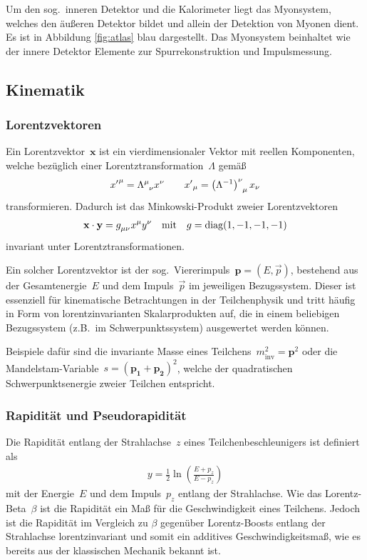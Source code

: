 \documentclass[11pt, a4paper]{article}
\numberwithin{equation}{section}
\begin{document}
Um den sog.\ inneren Detektor und die Kalorimeter liegt das Myonsystem, welches den äußeren Detektor bildet und allein der Detektion von Myonen dient.
Es ist in Abbildung \ref{fig:atlas} blau dargestellt.
Das Myonsystem beinhaltet wie der innere Detektor Elemente zur Spurrekonstruktion und Impulsmessung.


\subsection{Kinematik}

\subsubsection{Lorentzvektoren}
Ein Lorentzvektor~$\mathbf{x}$ ist ein vierdimensionaler Vektor mit reellen Komponenten, welche bezüglich einer Lorentztransformation~$\Lambda$ gemäß
\begin{align*}
	{x^\prime}^\mu = \tensor{\Lambda}{^\mu_\nu} x^\nu \qquad {x^\prime}_\mu = \tensor{\left(\Lambda^{-1}\right)}{^\nu_\mu} x_\nu
\end{align*}
transformieren.
Dadurch ist das Minkowski-Produkt zweier Lorentzvektoren
\begin{align*}
	\mathbf{x} \cdot \mathbf{y} = \tensor{g}{_\mu_\nu} x^\mu y^\nu \quad \text{mit} \quad g = \mathrm{diag}(1,-1,-1,-1)
\end{align*}
invariant unter Lorentztransformationen.

Ein solcher Lorentzvektor ist der sog.\ Viererimpuls~$\mathbf{p} = \left(E, \vec{p}\right)$, bestehend aus der Gesamtenergie~$E$ und dem Impuls~$\vec{p}$ im jeweiligen Bezugssystem.
Dieser ist essenziell für kinematische Betrachtungen in der Teilchenphysik und tritt häufig in Form von lorentzinvarianten Skalarprodukten auf, die in einem beliebigen Bezugssystem (z.B.\ im Schwerpunktssystem) ausgewertet werden können.

Beispiele dafür sind die invariante Masse eines Teilchens~$m_\mathrm{inv}^2 = \mathbf{p}^2$ oder die Mandelstam-Variable~$s = (\mathbf{p_1} + \mathbf{p_2})^2$, welche der quadratischen Schwerpunktsenergie zweier Teilchen entspricht.

\subsubsection{Rapidität und Pseudorapidität}
Die Rapidität entlang der Strahlachse~$z$ eines Teilchenbeschleunigers ist definiert als \cite{script}
\begin{align*}
	y = \frac{1}{2}\ln\left( \frac{E+p_z}{E-p_z} \right)
\end{align*}
mit der Energie~$E$ und dem Impuls~$p_z$ entlang der Strahlachse.
Wie das Lorentz-Beta~$\beta$ ist die Rapidität ein Maß für die Geschwindigkeit eines Teilchens.
Jedoch ist die Rapidität im Vergleich zu $\beta$ gegenüber Lorentz-Boosts entlang der Strahlachse lorentzinvariant und somit ein additives Geschwindigkeitsmaß, wie es bereits aus der klassischen Mechanik bekannt ist.
\end{document}
